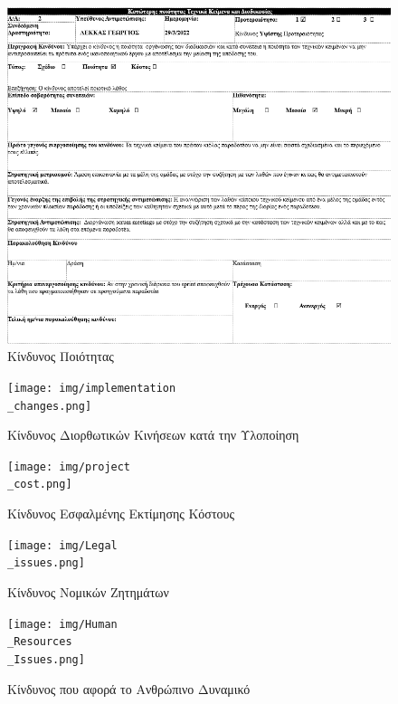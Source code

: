 \documentclass{../ol-softwaremanual}
\begin{document}
	\newpage
	
	
	
	\begin{figure}[htbp!]
		\includegraphics[scale=0.76]{img/bad_quality.png}
		\caption{Κίνδυνος Ποιότητας}
	\end{figure}
	
	\newpage
	
	\begin{figure}[htbp!]
		\texttt{[image: img/implementation\\\_changes.png]}
		\caption{Κίνδυνος Διορθωτικών Κινήσεων κατά την Υλοποίηση}
	\end{figure}
	
	
	
	\newpage
	
	\begin{figure}[htbp!]
		\texttt{[image: img/project\\\_cost.png]}
		\caption{Κίνδυνος Εσφαλμένης Εκτίμησης Κόστους}
	\end{figure}
	
	\newpage
	
	\begin{figure}[htbp!]
		\texttt{[image: img/Legal\\\_issues.png]}
		\caption{Κίνδυνος Νομικών Ζητημάτων}
	\end{figure}
	
	
	\newpage
	
	\begin{figure}[htbp!]
		\texttt{[image: img/Human\\\_Resources\\\_Issues.png]}
		\caption{Kίνδυνος που αφορά το Ανθρώπινο Δυναμικό}
	\end{figure}
\end{document}
